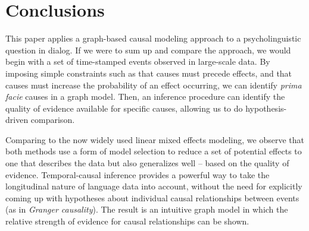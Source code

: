 
\section{Conclusions}

This paper applies a graph-based causal modeling approach to a psycholinguistic question in dialog.  If we were to sum up and compare the approach, we would begin with a set of time-stamped events observed in large-scale data.  By imposing simple constraints such as that causes must precede effects, and that causes must increase the probability of an effect occurring, we can identify \emph{prima facie} causes in a graph model.  Then, an inference procedure can identify the quality of evidence available for specific causes, allowing us to do hypothesis-driven comparison.

Comparing to the now widely used linear mixed effects modeling, we observe that both methods use a form of model selection to reduce a set of potential effects to one that describes the data but also generalizes well -- based on the quality of evidence.  Temporal-causal inference provides a powerful way to take the longitudinal nature of language data into account, without the need for explicitly coming up with hypotheses about individual causal relationships between events (as in \emph{Granger causality}).  The result is an intuitive graph model in which the relative strength of evidence for causal relationships can be shown.

